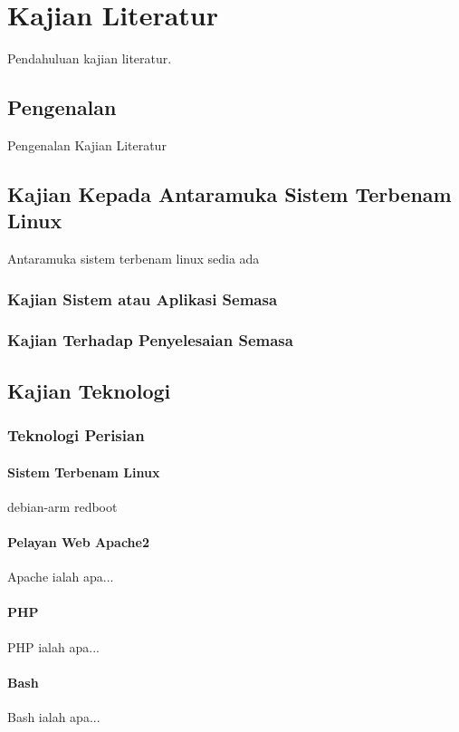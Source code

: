\chapter{Kajian Literatur}\label{c1}%
Pendahuluan kajian literatur.

\section{Pengenalan}
Pengenalan Kajian Literatur

\section{Kajian Kepada Antaramuka Sistem Terbenam Linux}
Antaramuka sistem terbenam linux sedia ada

\subsection{Kajian Sistem atau Aplikasi Semasa}

\subsection{Kajian Terhadap Penyelesaian Semasa}

\section{Kajian Teknologi}

\subsection{Teknologi Perisian}

\subsubsection{Sistem Terbenam Linux}
debian-arm
redboot

\subsubsection{Pelayan Web Apache2}
Apache ialah apa...

\subsubsection{PHP}
PHP ialah apa...

\subsubsection{Bash}
Bash ialah apa...

